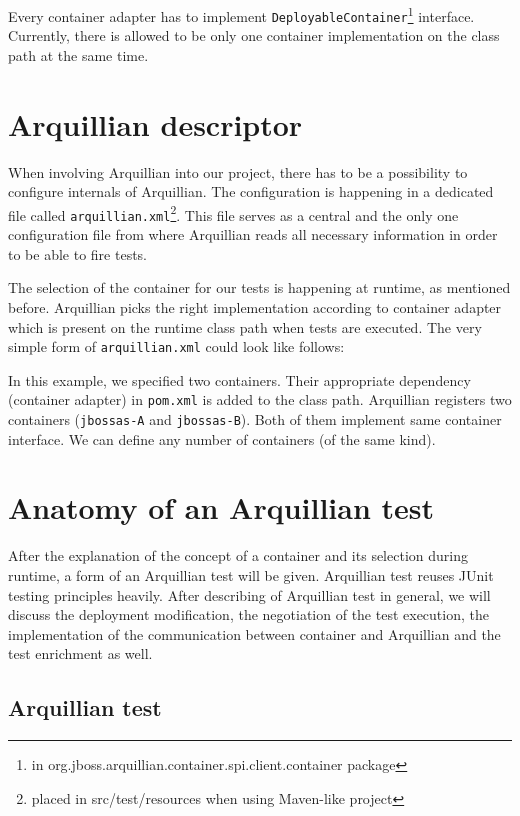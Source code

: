 \documentclass[12pt,final,oneside]{fithesis}
\begin{document}
Every container adapter has to implement \texttt{DeployableContainer}\footnote{in org.jboss.arquillian.container.spi.client.container package} interface. Currently, there is allowed to be only one container implementation on the class path at the same time.

	\section{Arquillian descriptor}

When involving Arquillian into our project, there has to be a possibility to configure internals of Arquillian. The configuration is happening in a dedicated file called \texttt{arquillian.xml}\footnote{placed in src/test/resources when using Maven-like project}. This file serves as a central and the only one configuration file from where Arquillian reads all necessary information in order to be able to fire tests.

The selection of the container for our tests is happening at runtime, as mentioned before. Arquillian picks the right implementation according to container adapter which is present on the runtime class path when tests are executed. The very simple form of \texttt{arquillian.xml} could look like follows:



In this example, we specified two containers. Their appropriate dependency (container adapter) in \texttt{pom.xml} is added to the class path. Arquillian registers two containers (\texttt{jbossas-A} and \texttt{jbossas-B}). Both of them implement same container interface. We can define any number of containers (of the same kind). 

	\section{Anatomy of an Arquillian test}
	
After the explanation of the concept of a container and its selection during runtime, a form of an Arquillian test will be given. Arquillian test reuses JUnit testing principles heavily. After describing of Arquillian test in general, we will discuss the deployment modification, the negotiation of the test execution, the implementation of the communication between container and Arquillian and the test enrichment as well.

		\subsection{Arquillian test}
\end{document}
